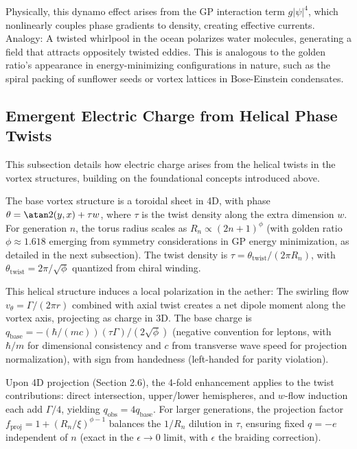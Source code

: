 Physically, this dynamo effect arises from the GP interaction term $g |\psi|^4$, which nonlinearly couples phase gradients to density, creating effective currents. Analogy: A twisted whirlpool in the ocean polarizes water molecules, generating a field that attracts oppositely twisted eddies. This is analogous to the golden ratio's appearance in energy-minimizing configurations in nature, such as the spiral packing of sunflower seeds or vortex lattices in Bose-Einstein condensates.

\subsection{Emergent Electric Charge from Helical Phase Twists}

This subsection details how electric charge arises from the helical twists in the vortex structures, building on the foundational concepts introduced above.

The base vortex structure is a toroidal sheet in 4D, with phase $\theta = \atan2(y, x) + \tau w$, where $\tau$ is the twist density along the extra dimension $w$. For generation $n$, the torus radius scales as $R_n \propto (2n+1)^\phi$ (with golden ratio $\phi \approx 1.618$ emerging from symmetry considerations in GP energy minimization, as detailed in the next subsection). The twist density is $\tau = \theta_{\text{twist}} / (2\pi R_n)$, with $\theta_{\text{twist}} = 2\pi / \sqrt{\phi}$ quantized from chiral winding.

This helical structure induces a local polarization in the aether: The swirling flow $v_{\theta} = \Gamma / (2\pi r)$ combined with axial twist creates a net dipole moment along the vortex axis, projecting as charge in 3D. The base charge is $q_{\text{base}} = - (\hbar / (m c)) (\tau \Gamma) / (2 \sqrt{\phi})$ (negative convention for leptons, with $\hbar / m$ for dimensional consistency and $c$ from transverse wave speed for projection normalization), with sign from handedness (left-handed for parity violation).

Upon 4D projection (Section 2.6), the 4-fold enhancement applies to the twist contributions: direct intersection, upper/lower hemispheres, and $w$-flow induction each add $\Gamma/4$, yielding $q_{\text{obs}} = 4 q_{\text{base}}$. For larger generations, the projection factor $f_{\text{proj}} = 1 + (R_n / \xi)^{\phi - 1}$ balances the $1/R_n$ dilution in $\tau$, ensuring fixed $q = -e$ independent of $n$ (exact in the $\epsilon \to 0$ limit, with $\epsilon$ the braiding correction).


